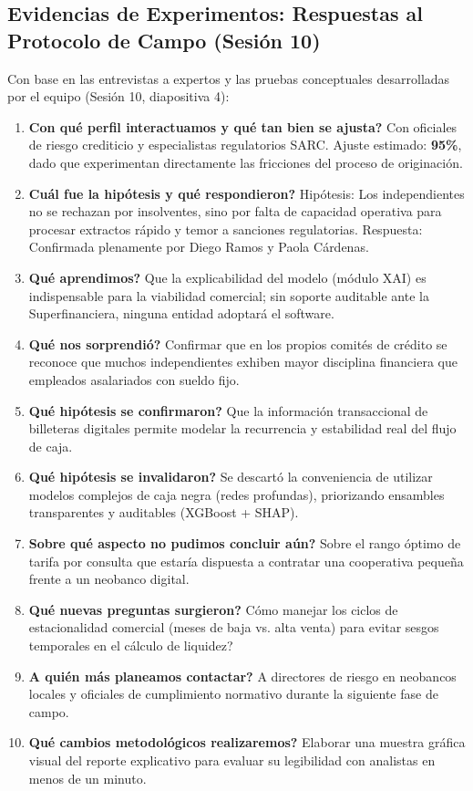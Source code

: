\documentclass[11pt,a4paper]{article}
\begin{document}
\subsection{Evidencias de Experimentos: Respuestas al Protocolo de Campo (Sesi\'on 10)}
Con base en las entrevistas a expertos y las pruebas conceptuales desarrolladas por el equipo (Sesi\'on 10, diapositiva 4):

\begin{enumerate}[leftmargin=*]
    \item \textbf{\textquestiondown Con qu\'e perfil interactuamos y qu\'e tan bien se ajusta?} Con oficiales de riesgo crediticio y especialistas regulatorios SARC. Ajuste estimado: \textbf{95\%}, dado que experimentan directamente las fricciones del proceso de originaci\'on.
    \item \textbf{\textquestiondown Cu\'al fue la hip\'otesis y qu\'e respondieron?} Hip\'otesis: Los independientes no se rechazan por insolventes, sino por falta de capacidad operativa para procesar extractos r\'apido y temor a sanciones regulatorias. Respuesta: Confirmada plenamente por Diego Ramos y Paola C\'ardenas.
    \item \textbf{\textquestiondown Qu\'e aprendimos?} Que la explicabilidad del modelo (m\'odulo XAI) es indispensable para la viabilidad comercial; sin soporte auditable ante la Superfinanciera, ninguna entidad adoptar\'a el software.
    \item \textbf{\textquestiondown Qu\'e nos sorprendi\'o?} Confirmar que en los propios comit\'es de cr\'edito se reconoce que muchos independientes exhiben mayor disciplina financiera que empleados asalariados con sueldo fijo.
    \item \textbf{\textquestiondown Qu\'e hip\'otesis se confirmaron?} Que la informaci\'on transaccional de billeteras digitales permite modelar la recurrencia y estabilidad real del flujo de caja.
    \item \textbf{\textquestiondown Qu\'e hip\'otesis se invalidaron?} Se descart\'o la conveniencia de utilizar modelos complejos de caja negra (redes profundas), priorizando ensambles transparentes y auditables (XGBoost + SHAP).
    \item \textbf{\textquestiondown Sobre qu\'e aspecto no pudimos concluir a\'un?} Sobre el rango \'optimo de tarifa por consulta que estar\'ia dispuesta a contratar una cooperativa peque\~na frente a un neobanco digital.
    \item \textbf{\textquestiondown Qu\'e nuevas preguntas surgieron?} \textquestiondown C\'omo manejar los ciclos de estacionalidad comercial (meses de baja vs. alta venta) para evitar sesgos temporales en el c\'alculo de liquidez?
    \item \textbf{\textquestiondown A qui\'en m\'as planeamos contactar?} A directores de riesgo en neobancos locales y oficiales de cumplimiento normativo durante la siguiente fase de campo.
    \item \textbf{\textquestiondown Qu\'e cambios metodol\'ogicos realizaremos?} Elaborar una muestra gr\'afica visual del reporte explicativo para evaluar su legibilidad con analistas en menos de un minuto.
\end{enumerate}
\end{document}
